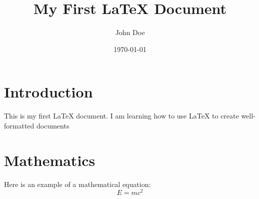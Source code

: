 \documentclass{article} %
\begin{document}

\title{My First LaTeX Document} %
\author{John Doe} %
\date{\today} %

\maketitle %

\section{Introduction} %
This is my first LaTeX document. I am learning how to use LaTeX to create well-formatted documents

\section{Mathematics} %
Here is an example of a mathematical equation:
\begin{equation}
E = mc^2
\end{equation}
\end{document}

